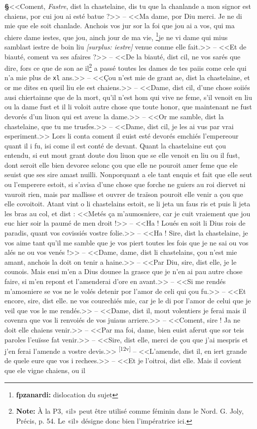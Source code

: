 \documentclass[12pt]{article} %
\newcommand{\foliomar}[2]{\marginnote{\href{#2}{[#1]}}}
\newcommand{\foliomarID}[1]{\textsuperscript{[#1]}} %
\newcommand{\persName}[1]{\emph{#1}} %
\newcommand{\num}[1]{\texttt{#1}}    %
\newcommand{\supplied}[1]{\textlangle#1\textrangle} %
\newcommand{\fnnote}[1]{\footnote{\textbf{Note:} #1}} %
\newcommand{\fnfpz}[1]{\footnote{\textbf{fpzanardi:} #1}} %
\newcommand{\surplus}[1]{\textit{[surplus: #1]}} %
\newcounter{paranum}
\newcommand{\pnum}{\stepcounter{paranum}\textbf{§\arabic{paranum}}\quad}
\begin{document}
\pnum <<Coment, \persName{Fastre}, dist la chastelaine, dis tu que la chanlande a mon signor est chaiens, por cui jou ai esté batue ?>> -- <<Ma dame, por Diu merci. Je ne di mie que ele soit chanlade. Anchois vos jur sor la foi que jou ai a vos, qui ma chiere dame iestes, que jou, ainch jour de ma vie, \fnfpz{dislocation du sujet}je ne vi dame qui mius samblast iestre de boin liu \surplus{iestre} venue conme elle fait.>> -- <<Et de biauté, coment va ses afaires ?>> -- <<De la biauté, dist cil, ne vos sarés que dire, fors ce que de son ae il\fnnote{À la P3, «il» peut être utilisé comme féminin dans le Nord. G. Joly, Précis, p. 54. Le «il» désigne donc bien l’impératrice ici.} a passé toutes les dames de tes paiis come cele qui n'a mie plus de \num{xl} ans.>> -- <<Çou n'est mie de grant ae, dist la chastelaine, et or me dites en queil liu ele est chaiens.>> -- <<Dame, dist cil, d'une chose soiiés ausi chiertainne que de la mort, qu'il n'est hom qui vive ne feme, s'il venoit en liu ou la dame fust et il li voloit autre chose que toute honor, que maintenant ne fust devorés d'un liuon qui est aveuc la dame.>> -- <<Or me samble, dist la chastelaine, que tu me trusfes.>> -- <<Dame, dist cil, je les ai \supplied{vus} par vrai esperiment.>> Lors li conta coment il euist esté devorés emchiés l'empereour q\supplied{ua}nt il i fu, isi come il est conté de devant. Quant la chastelaine eut çou entendu, si eut mout grant doute dou liuon que se elle venoit en liu ou il fust, dont seroit elle bien devoree selonc çou que elle ne pouroit amer feme que ele seuist que ses sire amast nuilli. Nonporquant a ele tant enquis et fait que elle seut ou l'emperere estoit, si s'avisa d'une chose que forche ne guiers au roi diervet ni vauroit rien, mais par mallisse et ouvrer de traïson pouroit elle venir a çou que elle covoitoit. Atant vint o li chastelains estoit, se li jeta un faus ris et puis li jeta les bras au col, et dist : <<Metés ça m'aumosniere, car je cuit vraiement que jou euc hier soir la paumé de men droit !>> -- <<Ha ! Loués en soit li Dius rois de paradis, quant vos covissiés vostre folie.>> -- <<Ha ! Sire, dist la chastelaine, je vos aime tant qu'il me samble que je vos piert toutes les fois que je ne sai ou vos alés ne ou vos venés !>> -- <<Dame, dame, dist li chastelains, çou n'est mie amant, anchois la doit on tenir a haine.>> -- <<Par Diu, sire, dist elle, je le counois. Mais ensi m'en a Dius dounee la grasce que je n'en ai pau autre chose faire, si m'en repont et l'amenderai d'ore en avant.>> -- <<Si me rendés m'amosniere se vos ne le volés detenir por l'amor de celi qui çou fu.>> -- <<Et encore, sire, dist elle. ne vos courechiés mie, car je le di por l'amor de celui que je veil que vos le me rendés.>> -- <<Dame, dist il, mout volentiers je ferai mais il covenra que vos li renvoiés de vos juiaus arriere.>> -- <<Coment, sire ! Ja ne doit elle chaiens venir.>> -- <<Par ma foi, dame, bien euist aferut que sor teis paroles l'euïsse fat venir.>> -- <<Sire, dist elle, merci de çou que j'ai mespris et j'en ferai l'amende a vostre devis.>> \foliomar{12va}{https://gallica.bnf.fr/ark:/12148/btv1b10023851v/f30.image} \foliomarID{12v} -- <<L'amende, dist il, en iert grande de q\supplied{ue}le eure que vos i rechees.>> -- <<Et je l'oitroi, dist elle. Mais il covient que ele vigne chaiens, ou il 
\end{document}
